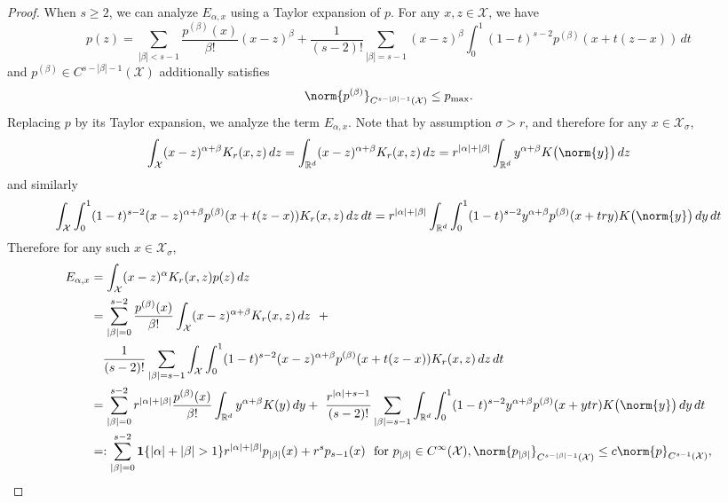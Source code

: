 \documentclass{article}
\newcommand{\Reals}{\mathbb{R}}
\newcommand{\abs}[1]{\left \lvert #1 \right \rvert}
\newcommand{\1}{\mathbf{1}}
\newcommand{\Rd}{\Reals^d}
\newcommand{\Xset}{\mathcal{X}}
\theoremstyle{alden}
\theoremstyle{aldenthm}
\theoremstyle{definition}
\theoremstyle{remark}
\begin{document}
\begin{proof}
	When $s \geq 2$, we can analyze $E_{\alpha,x}$ using a Taylor expansion of $p$.  For any $x,z \in \Xset$, we have
	\begin{equation*}
	p(z) = \sum_{\abs{\beta} < s  - 1} \frac{p^{(\beta)}(x)}{\beta!} (x - z)^{\beta} + \frac{1}{(s - 2)!}\sum_{\abs{\beta} = s - 1} (x - z)^{\beta} \int_{0}^{1}(1 - t)^{s - 2} p^{(\beta)}(x + t(z - x)) \,dt
	\end{equation*}
	and $p^{(\beta)} \in C^{s - \abs{\beta} - 1}(\Xset)$ additionally satisfies
	\begin{equation*}
	\norm{p^{(\beta)}}_{C^{s - \abs{\beta} - 1}(\Xset)} \leq p_{\max}.
	\end{equation*}
	Replacing $p$ by its Taylor expansion, we analyze the term $E_{\alpha,x}$. Note that by assumption $\sigma > r$, and therefore for any $x \in \Xset_{\sigma}$,
	\begin{equation*}
	\int_{\Xset} (x - z)^{\alpha + \beta} K_r(x,z) \,dz = \int_{\Rd} (x - z)^{\alpha + \beta} K_r(x,z) \,dz = r^{\abs{\alpha} + \abs{\beta}} \int_{\Rd} y^{\alpha + \beta} K\bigl(\norm{y}\bigr) \,dz
	\end{equation*} 
	and similarly
	\begin{equation*}
	\int_{\Xset} \int_{0}^{1} (1 - t)^{s - 2} (x - z)^{\alpha + \beta}  p^{(\beta)}(x + t(z - x)) K_r(x,z) \,dz \,dt = r^{\abs{\alpha} + \abs{\beta}}\int_{\Rd} \int_{0}^{1} (1 - t)^{s - 2} y^{\alpha + \beta}  p^{(\beta)}(x + try) K\bigl(\norm{y}\bigr) \,dy \,dt
	\end{equation*}
	Therefore for any such $x \in \Xset_{\sigma}$,
	\begin{align*}
	E_{\alpha,x} & = \int_{\Xset} (x - z)^{\alpha} K_r(x,z) p(z) \,dz \\
	& =  \sum_{\abs{\beta} = 0}^{s - 2} \frac{p^{(\beta)}(x)}{\beta!} \int_{\Xset} (x - z)^{\alpha + \beta}K_r(x,z)\,dz ~~+ \\
	& ~~~\frac{1}{(s - 2)!}\sum_{\abs{\beta} = s - 1} \int_{\Xset} \int_{0}^{1} (1 - t)^{s - 2} (x - z)^{\alpha + \beta}  p^{(\beta)}(x + t(z - x)) K_r(x,z) \,dz \,dt \\
	& = \sum_{\abs{\beta} = 0}^{s - 2} r^{\abs{\alpha} + \abs{\beta}} \frac{p^{(\beta)}(x)}{\beta!} \int_{\Rd} y^{\alpha + \beta}K(y)\,dy +~ \frac{r^{\abs{\alpha} + s - 1}}{(s - 2)!} \sum_{\abs{\beta} = s - 1} \int_{\Rd} \int_{0}^{1} (1 - t)^{s - 2} y^{\alpha + \beta} p^{(\beta)}(x + ytr) K\bigl(\norm{y}\bigr) \,dy \,dt \\
	& =: \sum_{\abs{\beta} = 0}^{s - 2} \1\{\abs{\alpha} + \abs{\beta} > 1\}r^{\abs{\alpha} + \abs{\beta}} p_{\abs{\beta}}(x) + r^s p_{s - 1}(x) ~~\textrm{for $p_{\abs{\beta}} \in C^{\infty}(\Xset), \norm{p_{\abs{\beta}}}_{C^{s - \abs{\beta} - 1}(\Xset)} \leq c \norm{p}_{C^{s - 1}(\Xset)}$},

\end{align*}
\end{proof}
\end{document}
